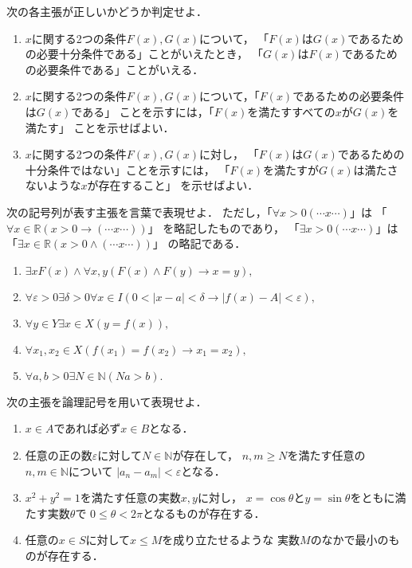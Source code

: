  \begin{que} \label{chp:sequent.sec:hituyoujubun.que:xhituyoujubun}
   次の各主張が正しいかどうか判定せよ．
   \begin{enumerate}
     \item $x$に関する2つの条件$F(x), G(x)$について，
       「$F(x)$は$G(x)$であるための必要十分条件である」ことがいえたとき，
       「$G(x)$は$F(x)$であるための必要条件である」ことがいえる． %
     \item $x$に関する2つの条件$F(x),G(x)$について，「$F(x)$であるための必要条件は$G(x)$である」
       ことを示すには，「$F(x)$を満たすすべての$x$が$G(x)$を満たす」
       ことを示せばよい． %
     \item $x$に関する2つの条件$F(x),G(x)$に対し，
       「$F(x)$は$G(x)$であるための十分条件ではない」ことを示すには，
       「$F(x)$を満たすが$G(x)$は満たさないような$x$が存在すること」
       を示せばよい． %
   \end{enumerate}
 \end{que}

 \begin{que} \label{que:kigoukaranihongo}
   次の記号列が表す主張を言葉で表現せよ．
   ただし，「$\forall x >0(\cdots x \cdots )$」は
   「$\forall x \in \mathbb{R}( x>0 \to (\cdots x \cdots ))$」
   を略記したものであり，
   「$\exists x>0 (\cdots x \cdots )$」は「$\exists x \in \mathbb{R}
   ( x>0 \land ( \cdots x \cdots ))$」
   の略記である．
   \begin{enumerate}
     \item $\exists x F(x) \land \forall x,y (F(x) \land F(y) \to x=y),$
     \item $\forall \varepsilon >0 \exists \delta >0 \forall x \in I
       ( 0< \lvert x- a \rvert < \delta \to \lvert f(x) - A \rvert < \varepsilon),$
     \item $\forall y \in Y \exists x \in X (y=f(x)),$
     \item $\forall x_1, x_2 \in X (f(x_1) = f(x_2) \to x_1 = x_2),$
     \item $\forall a,b >0 \exists N \in \mathbb{N} ( Na > b).$
   \end{enumerate}
 \end{que}

 \begin{que} \label{que:nihongokarakigou}
   次の主張を論理記号を用いて表現せよ．
   \begin{enumerate}
     \item $x \in A$であれば必ず$x \in B$となる．
     \item 任意の正の数$\varepsilon$に対して$N \in \mathbb{N}$が存在して，
       $n, m \geq N$を満たす任意の$n,m \in \mathbb{N}$について
       $\lvert a_n - a_m \rvert < \varepsilon$となる．
     \item $x^2+y^2=1$を満たす任意の実数$x,y$に対し，
       $x= \cos \theta $と$ y= \sin \theta$をともに満たす実数$\theta$で
       $0 \leq \theta < 2 \pi$となるものが存在する．
     \item 任意の$x \in S$に対して$x \leq M$を成り立たせるような
       実数$M$のなかで最小のものが存在する． 
   \end{enumerate}
 \end{que}

